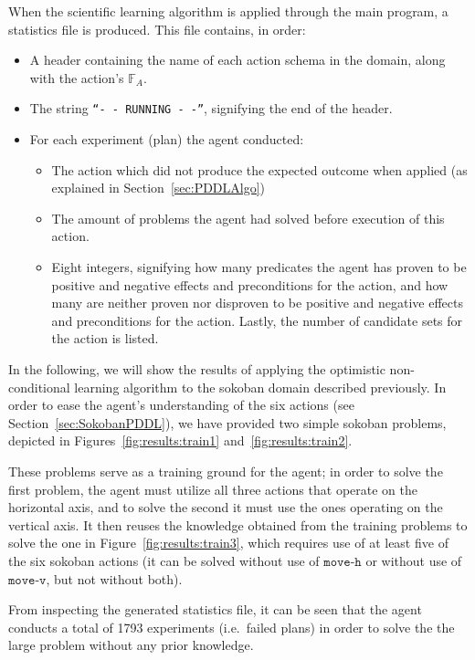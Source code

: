 \documentclass[Master.tex]{subfiles}
\begin{document}
When the scientific learning algorithm is applied through the main program, a statistics file is produced. This file contains, in order:
\begin{itemize}
    \item A header containing the name of each action schema in the domain, along with the action's $\mathbb{F}_A$.
    \item The string \texttt{``- - RUNNING - -''}, signifying the end of the header.
    \item For each experiment (plan) the agent conducted:
        \begin{itemize}
            \item The action which did not produce the expected outcome when applied (as explained in Section~\ref{sec:PDDLAlgo})
            \item The amount of problems the agent had solved before execution of this action.
            \item Eight integers, signifying how many predicates the agent has proven to be positive and negative effects and preconditions for the action, and how many are neither proven nor disproven to be positive and negative effects and preconditions for the action. Lastly, the number of candidate sets for the action is listed.
        \end{itemize}
\end{itemize}

In the following, we will show the results of applying the optimistic non-conditional learning algorithm to the sokoban domain described previously. In order to ease the agent's understanding of the  six actions (see Section~\ref{sec:SokobanPDDL}), we have provided two simple sokoban problems, depicted in Figures~\ref{fig:results:train1} and~\ref{fig:results:train2}. 

These problems serve as a training ground for the agent; in order to solve the first problem, the agent must utilize all three actions that operate on the horizontal axis, and to solve the second it must use the ones operating on the vertical axis. It then reuses the knowledge obtained from the training problems to solve the one in Figure~\ref{fig:results:train3}, which requires use of at least five of the six sokoban actions (it can be solved without use of $\texttt{move-h}$ or without use of $\texttt{move-v}$, but not without both).

From inspecting the generated statistics file, it can be seen that the agent conducts a total of 1793 experiments (i.e.\ failed plans) in order to solve the the large problem without any prior knowledge.
\end{document}

